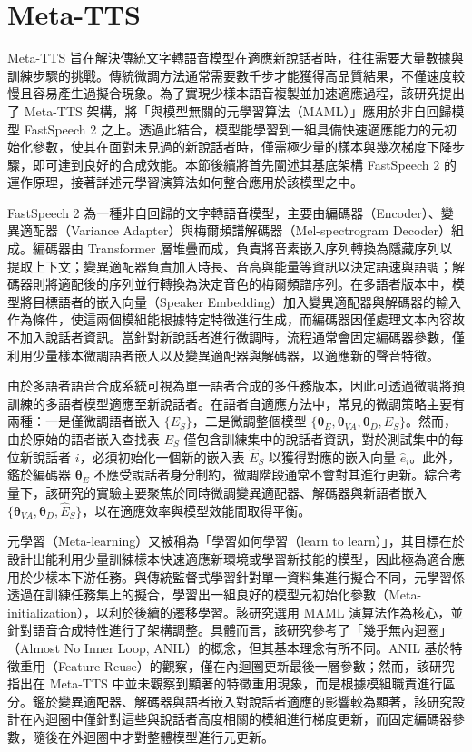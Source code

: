 \clearpage

\section{Meta-TTS}

Meta-TTS 旨在解決傳統文字轉語音模型在適應新說話者時，往往需要大量數據與訓練步驟的挑戰。傳統微調方法通常需要數千步才能獲得高品質結果，不僅速度較慢且容易產生過擬合現象。為了實現少樣本語音複製並加速適應過程，該研究提出了 Meta-TTS 架構，將「與模型無關的元學習算法（MAML）\cite{finn2017maml}」應用於非自回歸模型 FastSpeech 2 之上。透過此結合，模型能學習到一組具備快速適應能力的元初始化參數，使其在面對未見過的新說話者時，僅需極少量的樣本與幾次梯度下降步驟，即可達到良好的合成效能。本節後續將首先闡述其基底架構 FastSpeech 2 的運作原理，接著詳述元學習演算法如何整合應用於該模型之中。

FastSpeech 2 \cite{ren2021fastspeech}為一種非自回歸的文字轉語音模型，主要由編碼器（Encoder）、變異適配器（Variance Adapter）與梅爾頻譜解碼器（Mel-spectrogram Decoder）組成。編碼器由 Transformer 層堆疊而成，負責將音素嵌入序列轉換為隱藏序列以提取上下文；變異適配器負責加入時長、音高與能量等資訊以決定語速與語調；解碼器則將適配後的序列並行轉換為決定音色的梅爾頻譜序列。在多語者版本中，模型將目標語者的嵌入向量（Speaker Embedding）加入變異適配器與解碼器的輸入作為條件，使這兩個模組能根據特定特徵進行生成，而編碼器因僅處理文本內容故不加入說話者資訊。當針對新說話者進行微調時，流程通常會固定編碼器參數，僅利用少量樣本微調語者嵌入以及變異適配器與解碼器，以適應新的聲音特徵。

由於多語者語音合成系統可視為單一語者合成的多任務版本，因此可透過微調將預訓練的多語者模型適應至新說話者。在語者自適應方法中，常見的微調策略主要有兩種：一是僅微調語者嵌入 $\{E_S\}$，二是微調整個模型 $\{\bm{\theta}_E, \bm{\theta}_{VA}, \bm{\theta}_D, E_S\}$。然而，由於原始的語者嵌入查找表 $E_S$ 僅包含訓練集中的說話者資訊，對於測試集中的每位新說話者 $i$，必須初始化一個新的嵌入表 $\hat{E}_S$ 以獲得對應的嵌入向量 $\hat{e}_i$。此外，鑑於編碼器 $\bm{\theta}_E$ 不應受說話者身分制約，微調階段通常不會對其進行更新。綜合考量下，該研究的實驗主要聚焦於同時微調變異適配器、解碼器與新語者嵌入 $\{\bm{\theta}_{VA}, \bm{\theta}_D, \hat{E}_S\}$，以在適應效率與模型效能間取得平衡。

元學習（Meta-learning）又被稱為「學習如何學習（learn to learn）」，其目標在於設計出能利用少量訓練樣本快速適應新環境或學習新技能的模型，因此極為適合應用於少樣本下游任務。與傳統監督式學習針對單一資料集進行擬合不同，元學習係透過在訓練任務集上的擬合，學習出一組良好的模型元初始化參數（Meta-initialization），以利於後續的遷移學習。該研究選用 MAML\cite{finn2017maml} 演算法作為核心，並針對語音合成特性進行了架構調整。具體而言，該研究參考了「幾乎無內迴圈」（Almost No Inner Loop, ANIL）\cite{Raghu2020anil}的概念，但其基本理念有所不同。ANIL 基於特徵重用（Feature Reuse）的觀察，僅在內迴圈更新最後一層參數；然而，該研究指出在 Meta-TTS 中並未觀察到顯著的特徵重用現象，而是根據模組職責進行區分。鑑於變異適配器、解碼器與語者嵌入對說話者適應的影響較為顯著，該研究設計在內迴圈中僅針對這些與說話者高度相關的模組進行梯度更新，而固定編碼器參數，隨後在外迴圈中才對整體模型進行元更新。

